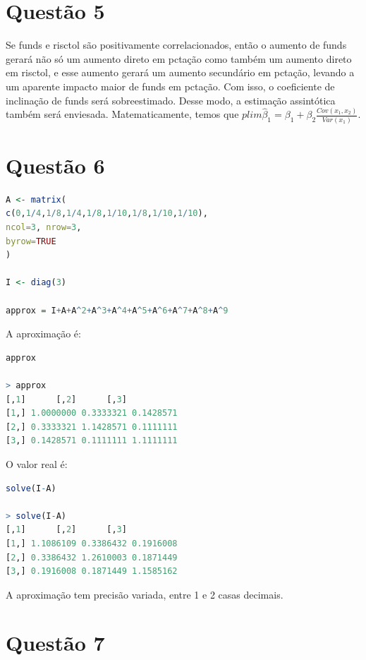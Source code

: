 \documentclass[12pt]{article}
\begin{document}
\section*{Questão 5}
Se funds e risctol são positivamente correlacionados, então o aumento de funds gerará não só um aumento direto em pctação como também um aumento direto em risctol, e esse aumento gerará um aumento secundário em pctação, levando a um aparente impacto maior de funds em pctação. Com isso, o coeficiente de inclinação de funds será sobreestimado. Desse modo, a estimação assintótica também será enviesada. Matematicamente, temos que $plim \hat{\beta}_{1}=\beta_{1}+\beta_{2}\frac{Cov(x_{1},x_{2})}{Var(x_{1})}$.

\section*{Questão 6}
\begin{lstlisting}[language=R]
A <- matrix(
c(0,1/4,1/8,1/4,1/8,1/10,1/8,1/10,1/10),
ncol=3, nrow=3,
byrow=TRUE
)

I <- diag(3)

approx = I+A+A^2+A^3+A^4+A^5+A^6+A^7+A^8+A^9
\end{lstlisting}
A aproximação é:
\begin{lstlisting}[language=R]
approx

> approx
[,1]      [,2]      [,3]
[1,] 1.0000000 0.3333321 0.1428571
[2,] 0.3333321 1.1428571 0.1111111
[3,] 0.1428571 0.1111111 1.1111111
\end{lstlisting}
O valor real é:
\begin{lstlisting}[language=R]
solve(I-A)

> solve(I-A)
[,1]      [,2]      [,3]
[1,] 1.1086109 0.3386432 0.1916008
[2,] 0.3386432 1.2610003 0.1871449
[3,] 0.1916008 0.1871449 1.1585162
\end{lstlisting}
A aproximação tem precisão variada, entre 1 e 2 casas decimais.\\

\section*{Questão 7}
\end{document}
